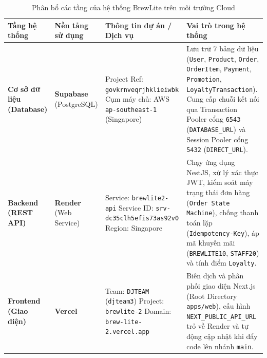 \begin{table}[H]
\centering
\small
\renewcommand{\arraystretch}{1.25}
\caption{Phân bổ các tầng của hệ thống BrewLite trên môi trường Cloud}
\vspace{0.2cm}
\begin{tabular}{|p{2.5cm}|p{2.6cm}|p{4.5cm}|p{5.3cm}|}
\hline
\textbf{Tầng hệ thống} & \textbf{Nền tảng sử dụng} & \textbf{Thông tin dự án / Dịch vụ} & \textbf{Vai trò trong hệ thống} \\ \hline
\textbf{Cơ sở dữ liệu (Database)} & \textbf{Supabase} \newline (PostgreSQL) & Project Ref: \newline \texttt{govkrnveqrjhklieiwbk} \newline Cụm máy chủ: \newline AWS \texttt{ap-southeast-1} (Singapore) & Lưu trữ 7 bảng dữ liệu (\texttt{User}, \texttt{Product}, \texttt{Order}, \texttt{OrderItem}, \texttt{Payment}, \texttt{Promotion}, \texttt{LoyaltyTransaction}). Cung cấp chuỗi kết nối qua Transaction Pooler cổng \texttt{6543} (\texttt{DATABASE\_URL}) và Session Pooler cổng \texttt{5432} (\texttt{DIRECT\_URL}). \\ \hline
\textbf{Backend (REST API)} & \textbf{Render} \newline (Web Service) & Service: \texttt{brewlite2-api} \newline Service ID: \newline \texttt{srv-dc35clh5efis73as92v0} \newline Region: Singapore & Chạy ứng dụng NestJS, xử lý xác thực JWT, kiểm soát máy trạng thái đơn hàng (\texttt{Order State Machine}), chống thanh toán lặp (\texttt{Idempotency-Key}), áp mã khuyến mãi (\texttt{BREWLITE10}, \texttt{STAFF20}) và tính điểm \texttt{Loyalty}. \\ \hline
\textbf{Frontend (Giao diện)} & \textbf{Vercel} & Team: \texttt{DJTEAM} (\texttt{djteam3}) \newline Project: \texttt{brewlite-2} \newline Domain: \texttt{brew-lite-2.vercel.app} & Biên dịch và phân phối giao diện Next.js (Root Directory \texttt{apps/web}), cấu hình \texttt{NEXT\_PUBLIC\_API\_URL} trỏ về Render và tự động cập nhật khi đẩy code lên nhánh \texttt{main}. \\ \hline
\end{tabular}
\label{tab:cloud-overview}
\end{table}

